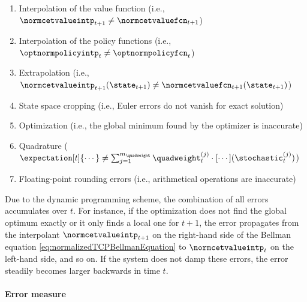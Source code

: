 \begin{enumerate}[
  label=E\arabic*.,
  ref=E\arabic*,
  leftmargin=2.7em,
]
  \item
  \label{item:financeErrorInterpolationValue}
  Interpolation of the value function
  (i.e., $\normcetvalueintp_{t+1} \not= \normcetvaluefcn_{t+1}$)
  
  \item
  \label{item:financeErrorInterpolationPolicy}
  Interpolation of the policy functions
  (i.e., $\optnormpolicyintp_t \not= \optnormpolicyfcn_t$)
  
  \item
  \label{item:financeErrorExtrapolation}
  Extrapolation
  (i.e., $
  \normcetvalueintp_{t+1}(\state_{t+1})
  \not= \normcetvaluefcn_{t+1}(\state_{t+1})
  $)
  
  \item
  \label{item:financeErrorCropping}
  State space cropping
  (i.e., Euler errors do not vanish for exact solution)
  
  \item
  \label{item:financeErrorOptimization}
  Optimization
  (i.e., the global minimum found by the optimizer is inaccurate)
  
  \item
  \label{item:financeErrorQuadrature}
  Quadrature
  ($
    \expectation[t]{\cdots}
    \not= \sum_{j=1}^{m_{\quadweight}} \quadweight_t^{(j)}
    \cdot [\cdots](\stochastic_t^{(j)})
  $)
  
  \item
  \label{item:financeErrorRounding}
  Floating-point rounding errors
  (i.e., arithmetical operations are inaccurate)
\end{enumerate}
Due to the dynamic programming scheme,
the combination of all errors accumulates over $t$.
For instance, if the optimization does not find the global optimum
exactly or it only finds a local one for $t + 1$,
the error propagates from the interpolant $\normcetvalueintp_{t+1}$
on the right-hand side of the Bellman equation
\eqref{eq:normalizedTCPBellmanEquation} to $\normcetvalueintp_t$
on the left-hand side, and so on.
If the system does not damp these errors,
the error steadily becomes larger backwards in time $t$.

\paragraph{Error measure}

